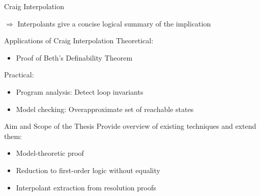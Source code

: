 \documentclass[final,hyperref={pdfpagelabels=true}]{beamer}
\newcommand{\gray}[1]{{\color{InfosysDarkGrey}#1}}
\newcommand\bicolorletter[2][]{%
   \tikz[baseline=(n.base),inner sep=0pt,outer xsep=0pt,#1]{
     \node(n){\phantom{#2}};
     \foreach \a/\c in {west/bclleft,east/bclright}{
       \begin{scope}
         \clip(n.south)rectangle(n.north \a);
				 \node[\c]at(n){${#2}$};
       \end{scope}
     }}}
\newcommand{\myA}{\tikzset{letter left=InfosysDarkGrey,letter right=TuInfRed}\bicolorletter{A}}
\newcommand{\myB}{\tikzset{letter left=InfosysDarkGrey,letter right=TuWienBlue}\bicolorletter{B}}
\begin{document}
\begin{frame}
\begin{columns}[t]
\begin{column}{\mycolwidth}
\begin{block}{Craig Interpolation}
				\begin{figure}[htbp]
					\centering
					\label{fig:interpol}
				\end{figure}

				$\Rightarrow$ Interpolants give a concise logical summary of the implication

			\end{block}

			\begin{block}{Applications of Craig Interpolation} 
				Theoretical:
				\begin{itemize}
					\item Proof of Beth's Definability Theorem
				\end{itemize}
				Practical:
				\begin{itemize}
					\item Program analysis: Detect loop invariants
					\item Model checking: Overapproximate set of reachable states %
				\end{itemize}
			\end{block}


			\begin{block}{Aim and Scope of the Thesis}
				Provide overview of existing techniques and extend them:
				\begin{itemize}
					\item Model-theoretic proof 
					\item Reduction to first-order logic without equality
					\item Interpolant extraction from resolution proofs
				\end{itemize}
			\end{block}


\end{column}
\end{columns}
\end{frame}
\end{document}
